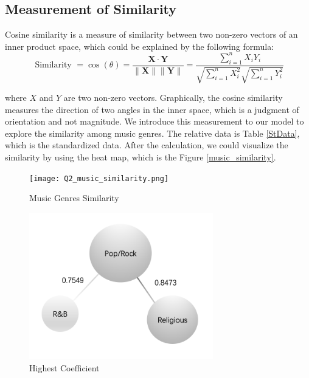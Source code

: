 \documentclass[12pt]{article}
\begin{document}
\subsection{Measurement of Similarity}
Cosine similarity is a measure of similarity between two non-zero vectors of an inner product space, which could be explained by the following formula:\\


\begin{equation}
\text { Similarity }=\cos (\theta)=\frac{\mathbf{X} \cdot \mathbf{Y}}{\|\mathbf{X}\|\|\mathbf{Y}\|}=\frac{\sum_{i=1}^{n} X_{i} Y_{i}}{\sqrt{\sum_{i=1}^{n} X_{i}^{2}} \sqrt{\sum_{i=1}^{n} Y_{i}^{2}}}
\end{equation}

where $X$ and $Y$ are two non-zero vectors.
Graphically, the cosine similarity measures the direction of two angles in the inner space, which is a judgment of orientation and not magnitude. We introduce this measurement to our model to explore the similarity among music genres.
The relative data is Table \ref{StData}, which is the standardized data. After the calculation, we could visualize the similarity by using the heat map, which is the Figure \ref{music_similarity}.

\begin{figure}[H]
\centering
\begin{minipage}[t]{0.48\textwidth}
\centering
\texttt{[image: Q2\_music\_similarity.png]}
\label{music_similarity}
\caption{Music Genres Similarity}
\end{minipage}
\begin{minipage}[t]{0.48\textwidth}
\centering
\includegraphics[width=8cm]{figures/Q2_coefficient.png}
\caption{Highest Coefficient}
\label{Highest Coefficient}
\end{minipage}
\end{figure}
\end{document}
